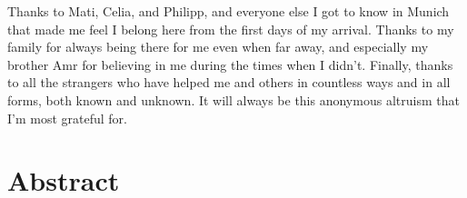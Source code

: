 Thanks to Mati, Celia, and Philipp, and everyone else I got to know in Munich that made me feel I belong here from the first days of my arrival. Thanks to my family for always being there for me even when far away, and especially my brother Amr for believing in me during the times when I didn’t. Finally, thanks to all the strangers who have helped me and others in countless ways and in all forms, both known and unknown. It will always be this anonymous altruism that I'm most grateful for.

\newpage


\section*{Abstract}

\newpage

\tableofcontents
\newpage


